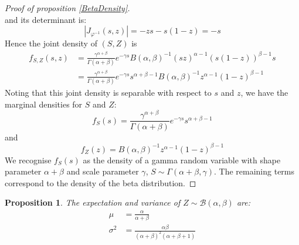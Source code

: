 \documentclass{amsart}
\theoremstyle{plain}
\newtheorem{proposition}{Proposition}[section]
\theoremstyle{remark}
\numberwithin{equation}{section}
\begin{document}
\begin{proof}[Proof of proposition \ref{BetaDensity}]
\[  \]
  and its determinant is:
  \[
    \left|J_{\varphi^{-1}}(s,z)\right| = -zs-s(1-z) = -s
  \]
  Hence the joint density of $(S,Z)$ is
  \[
    \begin{split}
      f_{S,Z}(s,z) &= \frac{\gamma^{\alpha+\beta}}{\Gamma(\alpha+\beta)}e^{-\gamma s}B(\alpha,\beta)^{-1}(sz)^{\alpha-1}(s(1-z))^{\beta-1}s\\
      &= \frac{\gamma^{\alpha+\beta}}{\Gamma(\alpha+\beta)}e^{-\gamma s}s^{\alpha+\beta-1}B(\alpha,\beta)^{-1}z^{\alpha-1}(1-z)^{\beta-1}
    \end{split}
  \]
  Noting that this joint density is separable with respect to  $s$ and $z$, we have the marginal densities for $S$ and $Z$:
  \[
    f_S(s) = \frac{\gamma^{\alpha+\beta}}{\Gamma(\alpha+\beta)}e^{-\gamma s}s^{\alpha+\beta-1}
  \]
  and
  \[
    f_Z(z) = B(\alpha,\beta)^{-1}z^{\alpha-1}(1-z)^{\beta-1}
  \]
  We recognise $f_S(s)$ as the density of a gamma random variable with
  shape parameter $\alpha+\beta$ and scale parameter $\gamma$,
  $S\sim \Gamma(\alpha+\beta,\gamma)$. The remaining terms correspond
  to the density of the beta distribution.
\end{proof}

\begin{proposition}\label{BetaMoments}
  The expectation and variance of $Z\sim \mathcal B(\alpha, \beta)$ are:
  \[
    \begin{split}
      \mu &= \frac{\alpha}{\alpha+\beta}\\
      \sigma^2 &= \frac{\alpha\beta}{(\alpha+\beta)^2(\alpha+\beta+1)}
    \end{split}
  \]
\end{proposition}
\end{document}
